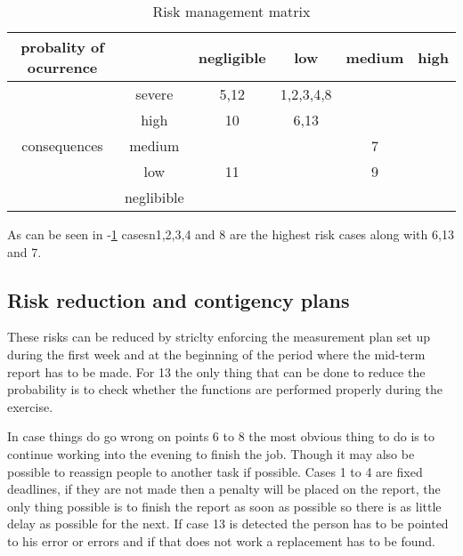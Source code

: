 \begin{table}
	\centering
		\begin{tabular}{c||c|c|c|c|c}
		probality of ocurrence &  & negligible & low & medium & high \\ \hline \hline
		 & severe & 5,12 & 1,2,3,4,8 &  &  \\ \hline
		 & high & 10 & 6,13 &  &  \\ \hline
		consequences & medium & & & 7 & \\ \hline
		 & low & 11 & & 9 & \\ \hline
		 & neglibible & & & & \\
		\hline
	\end{tabular}
	\caption{Risk management matrix}
	\label{sec:Riskmanagementmatrix}
\end{table}

As can be seen in -\ref{sec:Riskmanagementmatrix} casesn1,2,3,4 and 8 are the highest risk cases along with 6,13 and 7.

\subsection{Risk reduction and contigency plans}
These risks can be reduced by striclty enforcing the measurement plan set up during the first week and at the beginning of the period where the mid-term report has to be made. For 13 the only thing that can be done to reduce the probability is to check whether the functions are performed properly during the exercise.

In case things do go wrong on points 6 to 8 the most obvious thing to do is to continue working into the evening to finish the job. Though it may also be possible to reassign people to another task if possible. Cases 1 to 4 are fixed deadlines, if they are not made then a penalty will be placed on the report, the only thing possible is to finish the report as soon as possible so there is as little delay as possible for the next. If case 13 is detected the person has to be pointed to his error or errors and if that does not work a replacement has to be found.